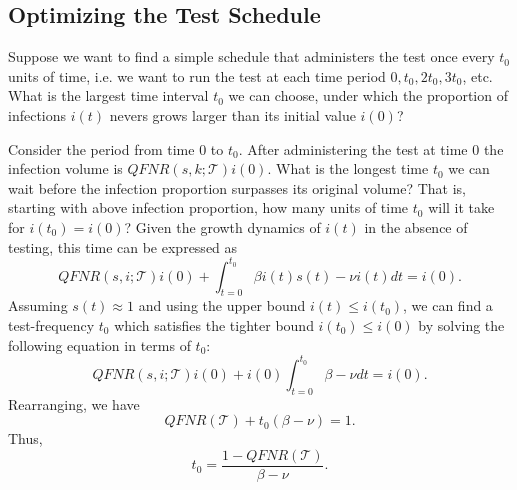 \documentclass[11pt]{article}
\begin{document}
\subsection{Optimizing the Test Schedule}
Suppose we want to find a simple schedule that administers the test once every $t_0$ units of time, 
i.e. we want to run the test at each time period $0, t_0, 2t_0, 3t_0$, etc.  What is the largest time
interval $t_0$ we can choose, under which the proportion of infections $i(t)$ nevers grows larger than
its initial value $i(0)$?

Consider the period from time $0$ to $t_0$.  After administering the test at time $0$ the infection volume
is $QFNR(s,k;\mathcal{T}) i(0)$.  What is the longest time $t_0$ we can wait before the infection proportion
surpasses its original volume?  That is, starting with above infection proportion, how many units of time $t_0$
will it take for $i(t_0)=i(0)$?
Given the growth dynamics of $i(t)$ in the absence of testing, this time can be expressed as
$$
QFNR(s,i;\mathcal{T})i(0) + \int_{t=0}^{t_0}\beta i(t)s(t) - \nu i(t)dt = i(0).
$$
Assuming $s(t)\approx 1$ and using the upper bound $i(t)\leq i(t_0)$, we can find a test-frequency $t_0$
which satisfies the tighter bound $i(t_0)\leq i(0)$ by solving the following equation in terms of $t_0$:
$$
QFNR(s,i;\mathcal{T})i(0) + i(0)\int_{t=0}^{t_0}\beta  - \nu dt = i(0).
$$
Rearranging, we have
$$
QFNR(\mathcal{T}) + t_0(\beta - \nu) = 1.
$$
Thus, 
$$
t_0 = \frac{1-QFNR(\mathcal{T})}{\beta - \nu}.
$$
\end{document}
